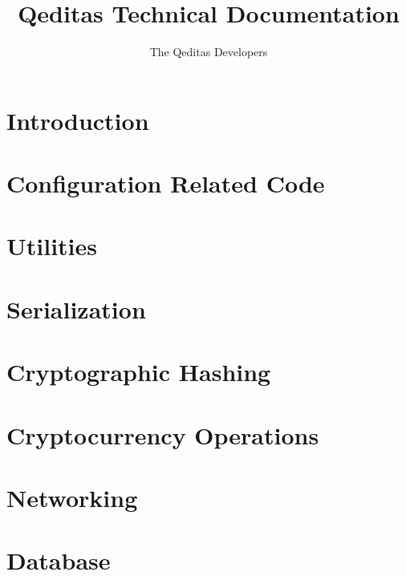 \documentclass{book}
\title{Qeditas Technical Documentation}
\author{The Qeditas Developers}
\begin{document}
\maketitle

\tableofcontents

\chapter{Introduction}



\chapter{Configuration Related Code}\label{chap:config}



\chapter{Utilities}\label{chap:utils}



\chapter{Serialization}\label{chap:ser}



\chapter{Cryptographic Hashing}\label{chap:hash}



\chapter{Cryptocurrency Operations}\label{chap:cryptocurr}



\chapter{Networking}\label{chap:net}



\chapter{Database}\label{chap:db}
\end{document}
